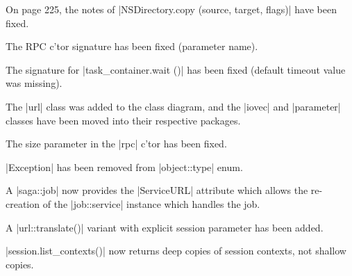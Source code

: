 \begin{shortlist}
  \item On page 225, the notes of |NSDirectory.copy (source, target, flags)| 
  have been fixed.
  
  \item The RPC c'tor signature has been fixed (parameter name).
  
  \item The signature for |task_container.wait ()| has been fixed
  (default timeout value was missing).
  
  \item The |url| class was added to the class diagram, and the
  |iovec| and |parameter| classes have been moved into their
  respective packages.
  
  \item The size parameter in the |rpc| c'tor has been fixed.
  
  \item |Exception| has been removed from |object::type| enum.
  
  \item A |saga::job| now provides the |ServiceURL| attribute which
  allows the re-creation of the |job::service| instance which handles
  the job.
  
  \item A |url::translate()| variant with explicit session parameter
  has been added.
  
  \item |session.list_contexts()| now returns deep copies of session
  contexts, not shallow copies.  

  \end{shortlist}

